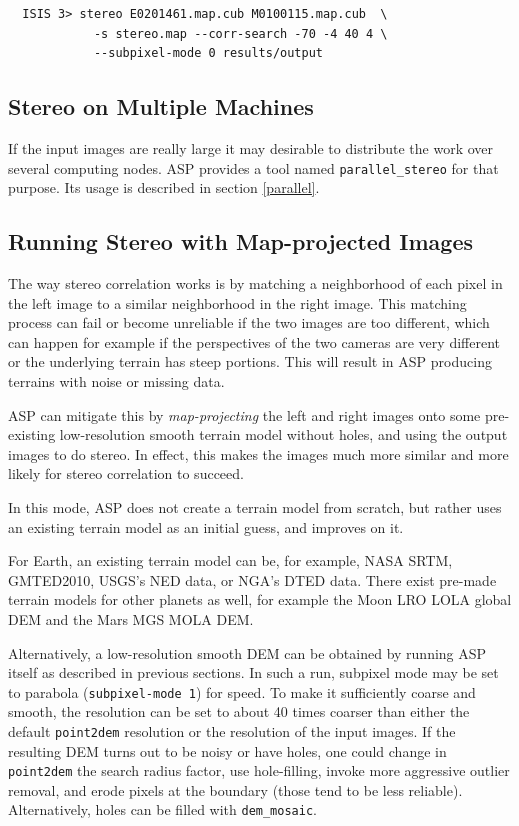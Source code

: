 \begin{verbatim}
  ISIS 3> stereo E0201461.map.cub M0100115.map.cub  \
            -s stereo.map --corr-search -70 -4 40 4 \
            --subpixel-mode 0 results/output
\end{verbatim}

\subsection{Stereo on Multiple Machines}

If the input images are really large it may desirable to distribute the
work over several computing nodes. ASP provides a tool named
\texttt{parallel\_stereo} for that purpose. Its usage is described in section
\ref{parallel}.

\subsection{Running Stereo with Map-projected Images}
\label{mapproj-example}

The way stereo correlation works is by matching a neighborhood of each
pixel in the left image to a similar neighborhood in the right image.
This matching process can fail or become unreliable if the two images
are too different, which can happen for example if the perspectives
of the two cameras are very different or the underlying terrain has
steep portions. This will result in ASP producing terrains with noise or
missing data.

ASP can mitigate this by \textit{map-projecting} the left and right
images onto some pre-existing low-resolution smooth terrain model
without holes, and using the output images to do stereo. In effect, this
makes the images much more similar and more likely for stereo
correlation to succeed.

In this mode, ASP does not create a terrain model from scratch,
but rather uses an existing terrain model as an initial guess, and
improves on it.

For Earth, an existing terrain model can be, for example, NASA SRTM,
GMTED2010, USGS's NED data, or NGA's DTED data. There exist pre-made
terrain models for other planets as well, for example the Moon LRO LOLA
global DEM and the Mars MGS MOLA DEM.


Alternatively, a low-resolution smooth DEM can be obtained by running
ASP itself as described in previous sections. In such a run, subpixel
mode may be set to parabola (\texttt{subpixel-mode 1}) for speed. To
make it sufficiently coarse and smooth, the resolution can be set to
about 40 times coarser than either the default \texttt{point2dem}
resolution or the resolution of the input images. If the resulting DEM
turns out to be noisy or have holes, one could change in
\texttt{point2dem} the search radius factor, use hole-filling, invoke more
aggressive outlier removal, and erode pixels at the boundary (those
tend to be less reliable). Alternatively, holes can be filled with
\texttt{dem\_mosaic}.

